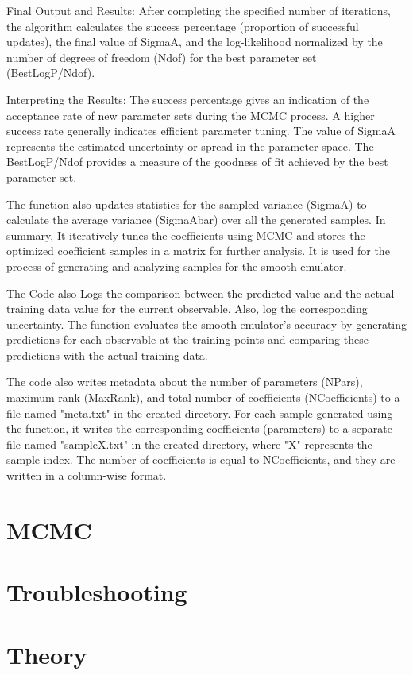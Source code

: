 \documentclass[12pt]{article}
\numberwithin{equation}{section}
\numberwithin{figure}{section}
\begin{document}
Final Output and Results:
After completing the specified number of iterations, the algorithm calculates the success percentage (proportion of successful updates), the final value of SigmaA, and the log-likelihood normalized by the number of degrees of freedom (Ndof) for the best parameter set (BestLogP/Ndof).  

Interpreting the Results:
The success percentage gives an indication of the acceptance rate of new parameter sets during the MCMC process. A higher success rate generally indicates efficient parameter tuning. The value of SigmaA represents the estimated uncertainty or spread in the parameter space. The BestLogP/Ndof provides a measure of the goodness of fit achieved by the best parameter set. 

The function also updates statistics for the sampled variance (SigmaA) to calculate the average variance (SigmaAbar) over all the generated samples. In summary, It iteratively tunes the coefficients using MCMC and stores the optimized coefficient samples in a matrix for further analysis. It is used for the process of generating and analyzing samples for the smooth emulator.

The Code also Logs the comparison between the predicted value and the actual training data value for the current observable. Also, log the corresponding uncertainty. The function evaluates the smooth emulator's accuracy by generating predictions for each observable at the training points and comparing these predictions with the actual training data.  

The code also writes metadata about the number of parameters (NPars), maximum rank (MaxRank), and total number of coefficients (NCoefficients) to a file named "meta.txt" in the created directory. For each sample generated using the function, it writes the corresponding coefficients (parameters) to a separate file named "sampleX.txt" in the created directory, where "X" represents the sample index. The number of coefficients is equal to NCoefficients, and they are written in a column-wise format. 


\section{MCMC}


\section{Troubleshooting}


\section{Theory}
\end{document}
